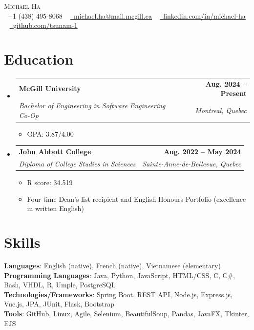 \documentclass[letterpaper,11pt]{article}
\makeatletter
\newcommand{\resumeItem}[1]{
  \item\small{
    {#1 \vspace{-2pt}}
  }
}
\newcommand{\resumeSubheading}[4]{
  \vspace{-2pt}\item
    \begin{tabular*}{1.0\textwidth}[t]{l@{\extracolsep{\fill}}r}
      \textbf{#1} & \textbf{\small #2} \\
      \textit{\small#3} & \textit{\small #4} \\
    \end{tabular*}\vspace{-7pt}
}
\newcommand{\resumeSubHeadingListStart}{\begin{itemize}[leftmargin=0.0in, label={}]}
\newcommand{\resumeSubHeadingListEnd}{\end{itemize}}
\newcommand{\resumeItemListStart}{\begin{itemize}}
\newcommand{\resumeItemListEnd}{\end{itemize}\vspace{-5pt}}
\makeatother
\begin{document}

\begin{center}
    {\Huge \scshape Michael Ha} \\ \vspace{1pt}
    \small \raisebox{-0.1\height}\faPhone\ +1 (438) 495-8068 ~ \href{mailto:michael.ha@mail.mcgill.ca}{\raisebox{-0.2\height}\faEnvelope\  \underline{michael.ha@mail.mcgill.ca}} ~ 
    \href{https://www.linkedin.com/in/michael-ha-in-a-trance/}{\raisebox{-0.2\height}\faLinkedin\ \underline{linkedin.com/in/michael-ha}}  ~
    \href{https://github.com/tsunam-1}{\raisebox{-0.2\height}\faGithub\ \underline{github.com/tsunam-1}}
    \vspace{-16pt}
\end{center}


\section{Education}
  \resumeSubHeadingListStart
    \resumeSubheading
      {McGill University}{Aug. 2024 -- Present}
      {Bachelor of Engineering in Software Engineering Co-Op}{Montreal, Quebec}
        \resumeItemListStart
            \resumeItem{GPA: 3.87/4.00}
        \resumeItemListEnd
    \resumeSubheading
      {John Abbott College}{Aug. 2022 -- May 2024}
      {Diploma of College Studies in Sciences}
      {Sainte-Anne-de-Bellevue, Quebec}
        \resumeItemListStart
            \resumeItem{R score: 34.519}
            \resumeItem{Four-time Dean's list recipient and English Honours Portfolio (excellence in written English)}
        \resumeItemListEnd
  \resumeSubHeadingListEnd

\section{Skills}
 \begin{itemize}[leftmargin=0.15in, label={}]
    \small{\item{
     \textbf{Languages}{: English (native), French (native), Vietnamese (elementary)} \\
     \textbf{Programming Languages}{: Java, Python, JavaScript, HTML/CSS, C, C\#, Bash, VHDL, R, Umple, PostgreSQL} \\
     \textbf{Technologies/Frameworks}{: Spring Boot, REST API, Node.js, Express.js, Vue.js, JPA, JUnit, Flask, Bootstrap} \\
     \textbf{Tools}{: GitHub, Linux, Agile, Selenium, BeautifulSoup, Pandas, JavaFX, Tkinter, EJS} \\
    }}
 \end{itemize}
 \vspace{-16pt}
\end{document}
